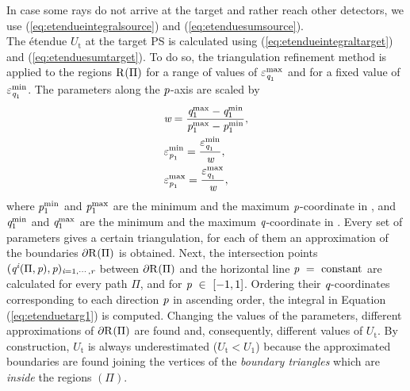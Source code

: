 In case some rays do not arrive at the target and rather reach other detectors, we use (\ref{eq:etendueintegralsource}) and (\ref{eq:etenduesumsource}).
\\ \indent The \'{e}tendue $U_{\textrm{t}}$ at the target PS is calculated using (\ref{eq:etendueintegraltarget}) and (\ref{eq:etenduesumtarget}).
To do so, the triangulation refinement method is applied to the regions $\mbox{$\textup{R}_{\textit{}}$}(\Pi)$ for a range of values of $\varepsilon_{\textit{q}_1}^{\textrm{max}}$ and for a fixed value of $\varepsilon_{\textit{q}_1}^{\textrm{min}}$. The parameters along the $\textit{p}$-axis are scaled by 
\begin{equation}\label{eq:scaled_parameters}
\begin{aligned}
& \textit{w} = \frac{\textit{q}_1^{\textrm{max}}-\textit{q}_1^{\textrm{min}}}{\textit{p}_1^{\textrm{max}}-\textit{p}_1^{\textrm{min}}},\\
&\varepsilon_{\textit{p}_1}^{\textrm{min}}= \frac{\varepsilon_{\textit{q}_1}^{\textrm{min}}}{\textit{w}}, \\
&\varepsilon_{\textit{p}_1}^{\textrm{max}}= \frac{\varepsilon_{\textit{q}_1}^{\textrm{max}}}{\textit{w}},
\end{aligned}
\end{equation}
 where 
$\textit{p}_1^{\textrm{min}}$ and $\textit{p}_1^{\textrm{max}}$ are the minimum and the maximum $\textit{p}$-coordinate in , and 
$\textit{q}_1^{\textrm{min}}$ and $\textit{q}_1^{\textrm{max}}$ are the minimum and the maximum $\textit{q}$-coordinate in . Every set of parameters gives a certain triangulation, for each of them an approximation of the boundaries $\partial\mbox{$\textup{R}_{\textit{}}$}(\Pi)$ is obtained.
Next, the intersection points $(\textit{q}^{\textit{i}}( \Pi, \textit{p}),\textit{p})_{\textit{i} = 1, \cdots, \textit{r}}$ between $\partial\mbox{$\textup{R}_{\textit{}}$}(\Pi)$
and the horizontal line $\textit{p}~=~ \textrm{constant}$ are calculated for every path $\Pi$, and for $\textit{p}~\in~[-1,1]$. Ordering their $\textit{q}$-coordinates corresponding to each direction $\textit{p}$ in ascending order, the integral in Equation (\ref{eq:etenduetarg1}) is computed.
Changing the values of the parameters, different approximations of $\partial\mbox{$\textup{R}_{\textit{}}$}(\Pi)$ are found and, consequently, different values of $U_{\textrm{t}}$. By construction, $U_{\textrm{t}}$ is always underestimated ($U_{\textrm{t}}<U_1$) because the approximated boundaries are found joining the vertices of the \textit{boundary triangles} which are \textit{inside} the regions $(\Pi)$.
